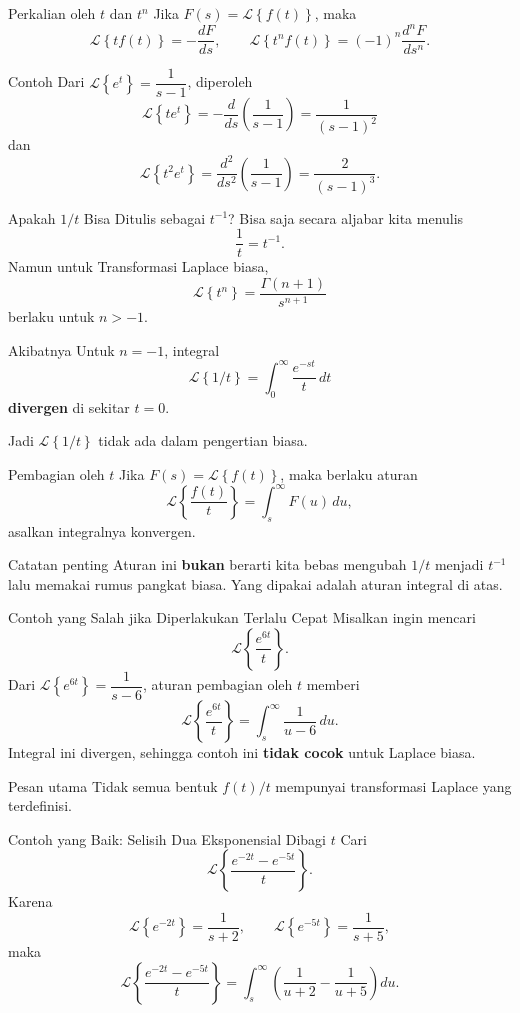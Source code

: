 \documentclass[aspectratio=169,10pt]{beamer}
\newcommand{\Lcal}{\mathcal{L}}
\newcommand{\Lap}[1]{\Lcal\left\{#1\right\}}
\begin{document}
\begin{frame}{Perkalian oleh $t$ dan $t^n$}
Jika $F(s)=\Lap{f(t)}$, maka
\[
\Lap{t f(t)}=-\frac{dF}{ds},
\qquad
\Lap{t^n f(t)}=(-1)^n\frac{d^nF}{ds^n}.
\]
\begin{exampleblock}{Contoh}
Dari $\Lap{e^t}=\dfrac{1}{s-1}$, diperoleh
\[
\Lap{t e^t}=-\frac{d}{ds}\left(\frac{1}{s-1}\right)=\frac{1}{(s-1)^2}
\]
dan
\[
\Lap{t^2 e^t}=\frac{d^2}{ds^2}\left(\frac{1}{s-1}\right)=\frac{2}{(s-1)^3}.
\]
\end{exampleblock}
\end{frame}

\begin{frame}{Apakah $1/t$ Bisa Ditulis sebagai $t^{-1}$?}
Bisa saja secara aljabar kita menulis
\[
\frac{1}{t}=t^{-1}.
\]
Namun untuk Transformasi Laplace biasa,
\[
\Lap{t^n}=\frac{\Gamma(n+1)}{s^{n+1}}
\]
berlaku untuk $n>-1$.
\begin{alertblock}{Akibatnya}
Untuk $n=-1$, integral
\[
\Lap{1/t}=\int_0^{\infty}\frac{e^{-st}}{t}\,dt
\]
\textbf{divergen} di sekitar $t=0$.
\end{alertblock}
Jadi $\Lap{1/t}$ tidak ada dalam pengertian biasa.
\end{frame}

\begin{frame}{Pembagian oleh $t$}
Jika $F(s)=\Lap{f(t)}$, maka berlaku aturan
\[
\Lap{\frac{f(t)}{t}}=\int_s^{\infty} F(u)\,du,
\]
asalkan integralnya konvergen.
\begin{block}{Catatan penting}
Aturan ini \textbf{bukan} berarti kita bebas mengubah $1/t$ menjadi $t^{-1}$ lalu memakai rumus pangkat biasa. Yang dipakai adalah aturan integral di atas.
\end{block}
\end{frame}

\begin{frame}{Contoh yang Salah jika Diperlakukan Terlalu Cepat}
Misalkan ingin mencari
\[
\Lap{\frac{e^{6t}}{t}}.
\]
Dari $\Lap{e^{6t}}=\dfrac{1}{s-6}$, aturan pembagian oleh $t$ memberi
\[
\Lap{\frac{e^{6t}}{t}}=\int_s^{\infty}\frac{1}{u-6}\,du.
\]
Integral ini divergen, sehingga contoh ini \textbf{tidak cocok} untuk Laplace biasa.
\begin{alertblock}{Pesan utama}
Tidak semua bentuk $f(t)/t$ mempunyai transformasi Laplace yang terdefinisi.
\end{alertblock}
\end{frame}

\begin{frame}{Contoh yang Baik: Selisih Dua Eksponensial Dibagi $t$}
Cari
\[
\Lap{\frac{e^{-2t}-e^{-5t}}{t}}.
\]
Karena
\[
\Lap{e^{-2t}}=\frac{1}{s+2},\qquad \Lap{e^{-5t}}=\frac{1}{s+5},
\]
maka
\[
\Lap{\frac{e^{-2t}-e^{-5t}}{t}}
=
\int_s^{\infty}\left(\frac{1}{u+2}-\frac{1}{u+5}\right)du.
\]
\end{frame}
\end{document}
